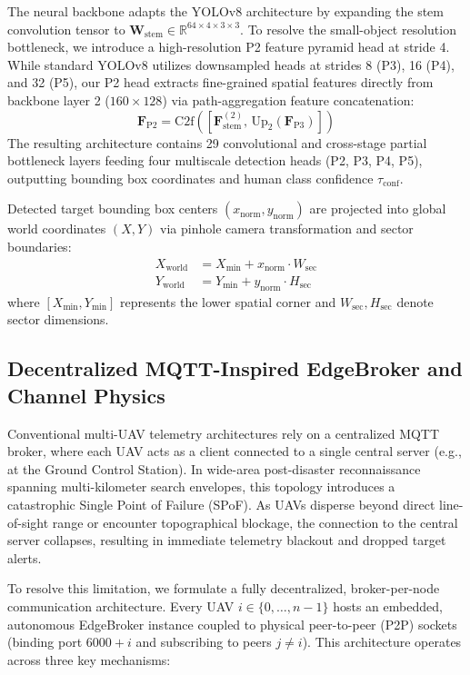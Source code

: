 \documentclass[conference]{IEEEtran}
\begin{document}
The neural backbone adapts the YOLOv8 architecture by expanding the stem convolution tensor to $\mathbf{W}_{\text{stem}} \in \mathbb{R}^{64 \times 4 \times 3 \times 3}$. To resolve the small-object resolution bottleneck, we introduce a high-resolution P2 feature pyramid head at stride 4. While standard YOLOv8 utilizes downsampled heads at strides 8 (P3), 16 (P4), and 32 (P5), our P2 head extracts fine-grained spatial features directly from backbone layer 2 ($160 \times 128$) via path-aggregation feature concatenation:
\begin{equation}
    \mathbf{F}_{\text{P2}} = \text{C2f}\left( \left[ \mathbf{F}_{\text{stem}}^{(2)}, \, \text{Up}_2(\mathbf{F}_{\text{P3}}) \right] \right)
\end{equation}
The resulting architecture contains 29 convolutional and cross-stage partial bottleneck layers feeding four multiscale detection heads (P2, P3, P4, P5), outputting bounding box coordinates and human class confidence $\tau_{\text{conf}}$.

Detected target bounding box centers $(x_{\text{norm}}, y_{\text{norm}})$ are projected into global world coordinates $(X, Y)$ via pinhole camera transformation and sector boundaries:
\begin{align}
    X_{\text{world}} &= X_{\text{min}} + x_{\text{norm}} \cdot W_{\text{sec}} \\
    Y_{\text{world}} &= Y_{\text{min}} + y_{\text{norm}} \cdot H_{\text{sec}}
\end{align}
where $[X_{\text{min}}, Y_{\text{min}}]$ represents the lower spatial corner and $W_{\text{sec}}, H_{\text{sec}}$ denote sector dimensions.

\subsection{Decentralized MQTT-Inspired EdgeBroker and Channel Physics}

Conventional multi-UAV telemetry architectures rely on a centralized MQTT broker, where each UAV acts as a client connected to a single central server (e.g., at the Ground Control Station). In wide-area post-disaster reconnaissance spanning multi-kilometer search envelopes, this topology introduces a catastrophic Single Point of Failure (SPoF). As UAVs disperse beyond direct line-of-sight range or encounter topographical blockage, the connection to the central server collapses, resulting in immediate telemetry blackout and dropped target alerts.

To resolve this limitation, we formulate a fully decentralized, broker-per-node communication architecture. Every UAV $i \in \{0, \dots, n-1\}$ hosts an embedded, autonomous EdgeBroker instance coupled to physical peer-to-peer (P2P) sockets (binding port $6000 + i$ and subscribing to peers $j \ne i$). This architecture operates across three key mechanisms:
\end{document}

